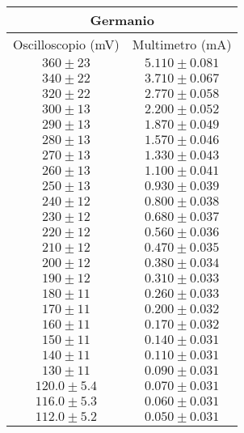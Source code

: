 \documentclass[@SRC@/main]{subfiles}
\begin{document}
\begin{center}
  \begin{tabular}{ ||c|c|| }
  \hline
  \multicolumn{2}{||c||}{Germanio}\\
  \hline
  Oscilloscopio (mV) & Multimetro (mA) \\
  \hline
  $360\pm 23$ & $5.110\pm 0.081$ \\
  \hline
  $340\pm 22$ & $3.710\pm 0.067$ \\
  \hline
  $320\pm 22$ & $2.770\pm 0.058$ \\
  \hline
  $300\pm 13$ & $2.200\pm 0.052$\\
  \hline
  $290\pm 13$ & $1.870\pm 0.049$ \\
  \hline
  $280\pm 13$ & $1.570\pm 0.046$ \\
  \hline
  $270\pm 13$ & $1.330\pm 0.043$ \\
  \hline
  $260\pm 13$ & $1.100\pm 0.041$ \\
  \hline
  $250\pm 13$ & $0.930\pm 0.039$ \\
  \hline
  $240\pm 12$ & $0.800\pm 0.038$ \\
  \hline
  $230\pm 12$ & $0.680\pm 0.037$ \\
  \hline 
  $220\pm 12$ & $0.560\pm 0.036$ \\
  \hline 
  $210\pm 12$ & $0.470\pm 0. 035$ \\
  \hline 
  $200\pm 12$ & $0.380\pm 0.034$ \\
  \hline 
  $190\pm 12$ & $0.310\pm 0.033$ \\
  \hline 
  $180\pm 11$ & $0.260\pm 0.033$ \\
  \hline 
  $170\pm 11$ & $0.200\pm 0.032$ \\
  \hline 
  $160\pm 11$ & $0.170\pm 0.032$ \\
  \hline 
  $150\pm 11$ & $0.140\pm 0.031$ \\
  \hline 
  $140\pm 11$ & $0.110\pm 0.031$ \\
  \hline 
  $130\pm 11$ & $0.090\pm 0.031$ \\
  \hline 
  $120.0\pm 5.4$ & $0.070\pm 0.031$ \\
  \hline 
  $116.0\pm 5.3$ & $0.060\pm 0.031$ \\
  \hline 
  $112.0\pm 5.2$ & $0.050\pm 0.031$ \\
  \hline 
 
  \end{tabular}   
 \end{center}
\end{document}

